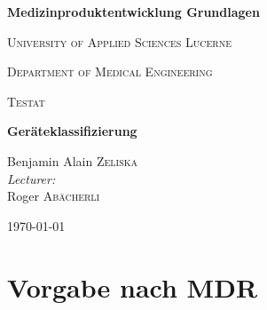 \documentclass[fontsize=11pt,a4paper] {article}
\begin{document}
	
	
	\begin{titlepage}
		\centering
		
		\vspace{2cm}
		
		{\huge \bfseries Medizinproduktentwicklung Grundlagen\par}
		
		\vspace{1cm}
		
		{\LARGE\scshape University of Applied Sciences Lucerne\par}
		
		\vspace{1cm}
		
		
		{\large\scshape Department of Medical Engineering}
		
		\vspace{2cm}
		
		{\Large\scshape Testat \par}
		
		{\Large \bfseries Geräteklassifizierung \par}
		
		\vspace{2.5cm}
		
		Benjamin Alain \textsc{Zeliska}\\[1.5cm]

		
		
		
		\emph{Lecturer:} \\ [0.3cm]
		{Roger  \textsc{Abächerli} }\\
		
		
		\vfill
		
		{\large \today\par}
	\end{titlepage}
	\tableofcontents
	\newpage
	
	\section{Vorgabe nach MDR}
	
	 
	
	
	
	
	
	\newpage
	
	\listoffigures%
	\listoftables%
	
	
	

	
	
\end{document}
